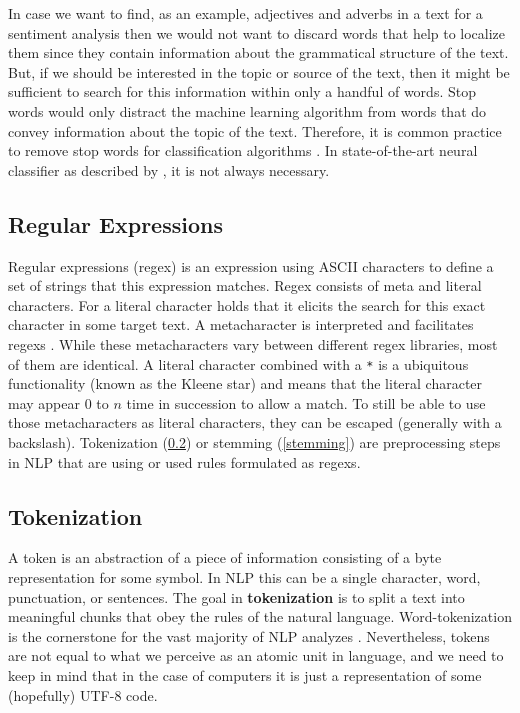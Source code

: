 In case we want to find, as an example,  adjectives and adverbs in a text for a sentiment analysis then we would not want to discard words that help to localize them since they contain information about the grammatical structure of the text.
But, if we should be interested in the topic or source of the text, then it might be sufficient to search for this information within only a handful of words.
Stop words would only distract the machine learning algorithm from words that do convey information about the topic of the text.
Therefore, it is common practice to remove stop words for classification algorithms \citep{McCallum1998, Lodhi2002, Tong2001}.
In state-of-the-art neural classifier as described by \cite{Howard2018}, it is not always necessary.

\subsection{Regular Expressions}
Regular expressions (\gls{regex}) is an expression using ASCII characters to define a set of strings that this expression matches.
Regex consists of meta and literal characters.
For a literal character holds that it elicits the search for this exact character in some target text.
A metacharacter is interpreted and facilitates regexs \citep{Kleene1951}.
While these metacharacters vary between different regex libraries, most of them are identical.
A literal character combined with a \texttt{*} is a ubiquitous functionality (known as the Kleene star) and means that the literal character may appear $0$ to $n$ time in succession to allow a match.
To still be able to use those metacharacters as literal characters, they can be escaped (generally with a backslash).
Tokenization (\ref{tokenization}) or stemming (\ref{stemming}) are preprocessing steps in NLP that are using or used rules formulated as regexs.

\subsection{Tokenization}\label{tokenization}
A token is an abstraction of a piece of information consisting of a byte representation for some symbol.
In NLP this can be a single character, word, punctuation, or sentences.
The goal in \textbf{tokenization} is to split a text into meaningful chunks that obey the rules of the natural language.
Word-tokenization is the cornerstone for the vast majority of NLP analyzes \citep{Webster1992}.
Nevertheless, tokens are not equal to what we perceive as an atomic unit in language, and we need to keep in mind that in the case of computers it is just a representation of some (hopefully) UTF-8 code.

